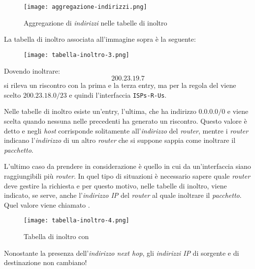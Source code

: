 \begin{figure}[h!]
    \centering
    \texttt{[image: aggregazione-indirizzi.png]}
    \caption{Aggregazione di \emph{indirizzi} nelle tabelle di inoltro}
\end{figure}
\newpage
\begin{eg}
    La tabella di inoltro associata all'immagine sopra è la seguente:
    \begin{figure}[h!]
        \centering
        \texttt{[image: tabella-inoltro-3.png]}
    \end{figure}

    \noindent Dovendo inoltrare:
    \[200.23.19.7\]
    si rileva un riscontro con la prima e la terza entry, ma per la regola
    del  viene scelto $200.23.18.0/23$ e quindi
    l'interfaccia \texttt{ISPs-R-Us}.
\end{eg}\noindent
Nelle tabelle di inoltro esiste un'entry, l'ultima, che ha indirizzo $0.0.0.0/0$
e viene scelta quando nessuna nelle precedenti ha generato un riscontro.
Questo valore è detto \emph{} e negli \emph{host}
corrisponde solitamente all'\emph{indirizzo} del \emph{router}, mentre i
\emph{router} indicano l'\emph{indirizzo} di un altro \emph{router} che si
suppone sappia come inoltrare il \emph{pacchetto}.

\bigskip\noindent
L'ultimo caso da prendere in considerazione è quello in cui da un'interfaccia
siano raggiungibili più \emph{router}. In quel tipo di situazioni è necessario
sapere quale \emph{router} deve gestire la richiesta e per questo motivo, nelle
tabelle di inoltro, viene indicato, se serve, anche l'\emph{indirizzo IP} del
\emph{router} al quale inoltrare il \emph{pacchetto}. Quel valore viene
chiamato \emph{}.

\begin{figure}[h!]
    \centering
    \texttt{[image: tabella-inoltro-4.png]}
    \caption{Tabella di inoltro con }
\end{figure}
\begin{note}
    Nonostante la presenza dell'\emph{indirizzo next hop}, gli \emph{indirizzi IP}
    di sorgente e di destinazione non cambiano!
\end{note}

